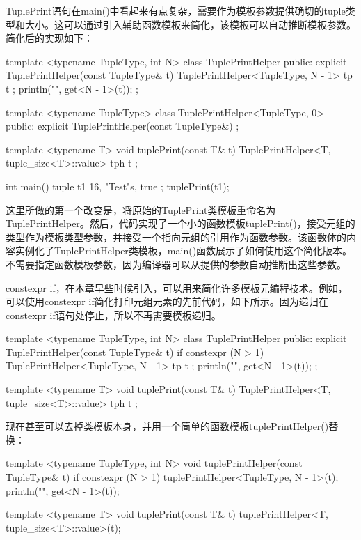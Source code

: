 TuplePrint语句在main()中看起来有点复杂，需要作为模板参数提供确切的tuple类型和大小。这可以通过引入辅助函数模板来简化，该模板可以自动推断模板参数。简化后的实现如下：

\begin{cpp}
template <typename TupleType, int N>
class TuplePrintHelper
{
    public:
        explicit TuplePrintHelper(const TupleType& t) {
            TuplePrintHelper<TupleType, N - 1> tp { t };
            println("{}", get<N - 1>(t));
        }
};

template <typename TupleType>
class TuplePrintHelper<TupleType, 0>
{
    public:
        explicit TuplePrintHelper(const TupleType&) { }
};

template <typename T>
void tuplePrint(const T& t)
{
    TuplePrintHelper<T, tuple_size<T>::value> tph { t };
}

int main()
{
    tuple t1 { 16, "Test"s, true };
    tuplePrint(t1);
}
\end{cpp}

这里所做的第一个改变是，将原始的TuplePrint类模板重命名为TuplePrintHelper。然后，代码实现了一个小的函数模板tuplePrint()，接受元组的类型作为模板类型参数，并接受一个指向元组的引用作为函数参数。该函数体的内容实例化了TuplePrintHelper类模板，main()函数展示了如何使用这个简化版本。不需要指定函数模板参数，因为编译器可以从提供的参数自动推断出这些参数。


constexpr if，在本章早些时候引入，可以用来简化许多模板元编程技术。例如，可以使用constexpr if简化打印元组元素的先前代码，如下所示。因为递归在constexpr if语句处停止，所以不再需要模板递归。

\begin{cpp}
template <typename TupleType, int N>
class TuplePrintHelper
{
    public:
        explicit TuplePrintHelper(const TupleType& t) {
            if constexpr (N > 1) {
                TuplePrintHelper<TupleType, N - 1> tp { t };
            }
            println("{}", get<N - 1>(t));
        }
};

template <typename T>
void tuplePrint(const T& t)
{
    TuplePrintHelper<T, tuple_size<T>::value> tph { t };
}
\end{cpp}

现在甚至可以去掉类模板本身，并用一个简单的函数模板tuplePrintHelper()替换：

\begin{cpp}
template <typename TupleType, int N>
void tuplePrintHelper(const TupleType& t)
{
    if constexpr (N > 1) {
        tuplePrintHelper<TupleType, N - 1>(t);
    }
    println("{}", get<N - 1>(t));
}

template <typename T>
void tuplePrint(const T& t)
{
    tuplePrintHelper<T, tuple_size<T>::value>(t);
}
\end{cpp}

